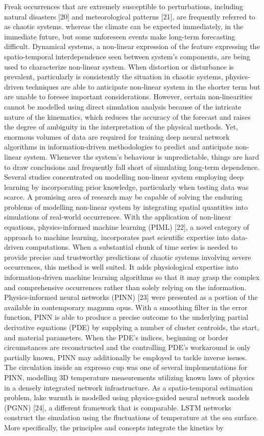 \documentclass[conference]{IEEEtran}
\begin{document}
Freak occurrences that are extremely susceptible to perturbations, including natural disasters [20] and meteorological patterns [21], are frequently referred to as chaotic systems. whereas the climate can be expected immediately, in the immediate future, but some unforeseen events make long-term forecasting difficult. Dynamical systems, a non-linear expression of the feature expressing the spatio-temporal interdependence seen between system's components, are being used to characterize non-linear system. When distortion or disturbance is prevalent, particularly is consistently the situation in chaotic systems, physics-driven techniques are able to anticipate non-linear system in the shorter term but are unable to foresee important considerations. However, certain non-linearities cannot be modelled using direct simulation analysis because of the intricate nature of the kinematics, which reduces the accuracy of the forecast and raises the degree of ambiguity in the interpretation of the physical methods. Yet, enormous volumes of data are required for training deep neural network algorithms in information-driven methodologies to predict and anticipate non-linear system. Whenever the system's behaviour is unpredictable, things are hard to draw conclusions and frequently fall short of simulating long-term dependence. Several studies concentrated on modelling non-linear system employing deep learning by incorporating prior knowledge, particularly when testing data was scarce. A promising area of research may be capable of solving the enduring problems of modelling non-linear system by integrating spatial quantities into simulations of real-world occurrences. With the application of non-linear equations, physics-informed machine learning (PIML) [22], a novel category of approach to machine learning, incorporates past scientific expertise into data-driven computations. When a substantial chunk of time series is needed to provide precise and trustworthy predictions of chaotic systems involving severe occurrences, this method is well suited. It adds physiological expertise into information-driven machine learning algorithms so that it may grasp the complex and comprehensive occurrences rather than solely relying on the information. Physics-informed neural networks (PINN) [23] were presented as a portion of the available in contemporary magnum opus. With a smoothing filter in the error function, PINN is able to produce a precise outcome to the underlying partial derivative equations (PDE) by supplying a number of cluster centroids, the start, and material parameters. When the PDE's indices, beginning or border circumstances are reconstructed and the controlling PDE's workaround is only partially known, PINN may additionally be employed to tackle inverse issues. The circulation inside an expresso cup was one of several implementations for PINN, modelling 3D temperature measurements utilizing known laws of physics in a densely integrated network infrastructure. As a spatio-temporal estimation problem, lake warmth is modelled using physics-guided neural network models (PGNN) [24], a different framework that is comparable. LSTM networks construct the simulation using the fluctuations of temperature at the sea surface. More specifically, the principles and concepts integrate the kinetics by 
\end{document}
